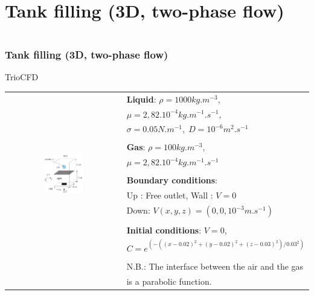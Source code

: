 \documentclass[10pt, hyperref={unicode=true,pdfusetitle, bookmarks=true,bookmarksnumbered=false,bookmarksopen=false, breaklinks=false,pdfborder={0 0 1},backref=true,colorlinks=true,linkcolor=darkblue,pageanchor}]{beamer}
\begin{document}
\section{{\bf{Tank filling (3D, two-phase flow)}}}
\begin{frame}
\begin{columns}[c] 
\tableofcontents[sections={1-9},currentsection, currentsubsection]
\tableofcontents[sections={10-16},currentsection, currentsubsection]
\end{columns}
\end{frame}
\begin{frame}
\frametitle{Tank filling (3D, two-phase flow)}
\begin{block}{TrioCFD}


\begin{tabular}{cl}
\multirow{14}{*}{\includegraphics[width=0.35\textwidth]{PICTURES/tank3D}}
 & \textbf{Liquid}: $\rho=1000kg.m^{-3},$ \tabularnewline
 & $\mu=2,82.10^{-4}kg.m^{-1}.s^{-1},$ \tabularnewline
 & $\sigma=0.05N.m^{-1},\; D=10^{-6}m^{2}.s^{-1}$\tabularnewline
 & \tabularnewline
 & \textbf{Gas}: $\rho=100kg.m^{-3},$\tabularnewline
 & $\mu=2,82.10^{-4}kg.m^{-1}.s^{-1}$\tabularnewline
 & \tabularnewline
 & \textbf{Boundary conditions}:  \tabularnewline
 & Up : Free outlet, \hspace{0.5cm} Wall : $V=0$ \tabularnewline
 & Down: $V(x,y,z)=(0,0,10^{-3}m.s^{-1})$\tabularnewline
 & \tabularnewline
 & \textbf{Initial conditions}: $V=0$, \tabularnewline
 & $C=e^{(-((x-0.02)^{2}+(y-0.02)^{2}+(z-0.03)^{2})/0.03^{2})}$ \tabularnewline
 & \tabularnewline
 & N.B.: The interface between the air and the gas\tabularnewline
 & is a parabolic function.\tabularnewline
\end{tabular}

\end{block}
\end{frame}
\end{document}
